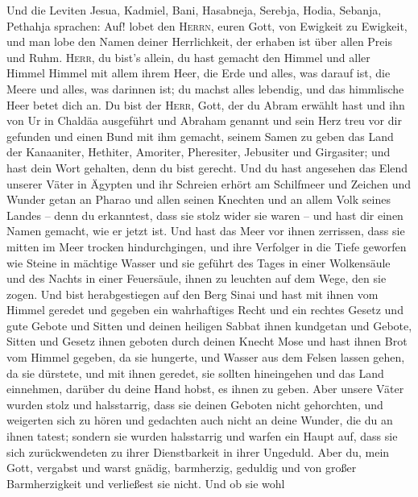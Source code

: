  Und die Leviten Jesua, Kadmiel, Bani, Hasabneja, Serebja,
Hodia, Sebanja, Pethahja sprachen: Auf! lobet den \textsc{Herrn}, euren
Gott, von Ewigkeit zu Ewigkeit, und man lobe den Namen deiner
Herrlichkeit, der erhaben ist über allen Preis und Ruhm. 
\textsc{Herr}, du bist's allein, du hast gemacht den Himmel und aller
Himmel Himmel mit allem ihrem Heer, die Erde und alles, was darauf ist,
die Meere und alles, was darinnen ist; du machst alles lebendig, und das
himmlische Heer betet dich an.  Du bist der \textsc{Herr},
Gott, der du Abram erwählt hast und ihn von Ur in Chaldäa ausgeführt und
Abraham genannt  und sein Herz treu vor dir gefunden und
einen Bund mit ihm gemacht, seinem Samen zu geben das Land der
Kanaaniter, Hethiter, Amoriter, Pheresiter, Jebusiter und Girgasiter;
und hast dein Wort gehalten, denn du bist gerecht.  Und du
hast angesehen das Elend unserer Väter in Ägypten und ihr Schreien
erhört am Schilfmeer  und Zeichen und Wunder getan an
Pharao und allen seinen Knechten und an allem Volk seines Landes -- denn
du erkanntest, dass sie stolz wider sie waren -- und hast dir einen
Namen gemacht, wie er jetzt ist.  Und hast das Meer vor
ihnen zerrissen, dass sie mitten im Meer trocken hindurchgingen, und
ihre Verfolger in die Tiefe geworfen wie Steine in mächtige Wasser
 und sie geführt des Tages in einer Wolkensäule und des
Nachts in einer Feuersäule, ihnen zu leuchten auf dem Wege, den sie
zogen.  Und bist herabgestiegen auf den Berg Sinai und
hast mit ihnen vom Himmel geredet und gegeben ein wahrhaftiges Recht und
ein rechtes Gesetz und gute Gebote und Sitten  und deinen
heiligen Sabbat ihnen kundgetan und Gebote, Sitten und Gesetz ihnen
geboten durch deinen Knecht Mose  und hast ihnen Brot vom
Himmel gegeben, da sie hungerte, und Wasser aus dem Felsen lassen gehen,
da sie dürstete, und mit ihnen geredet, sie sollten hineingehen und das
Land einnehmen, darüber du deine Hand hobst, es ihnen zu geben.
 Aber unsere Väter wurden stolz und halsstarrig, dass sie
deinen Geboten nicht gehorchten,  und weigerten sich zu
hören und gedachten auch nicht an deine Wunder, die du an ihnen tatest;
sondern sie wurden halsstarrig und warfen ein Haupt auf, dass sie sich
zurückwendeten zu ihrer Dienstbarkeit in ihrer Ungeduld. Aber du, mein
Gott, vergabst und warst gnädig, barmherzig, geduldig und von großer
Barmherzigkeit und verließest sie nicht.  Und ob sie wohl
